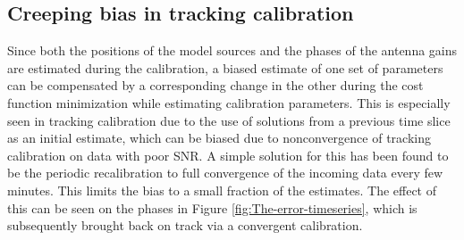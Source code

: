 \documentclass[referee]{aa}
\begin{document}
\subsection{Creeping bias in tracking calibration}

Since both  the positions  of the  model sources and the phases  of the
antenna gains are estimated during the calibration, a biased estimate of one set
of parameters can  be compensated by a corresponding change  in the other during
the cost function minimization  while estimating calibration parameters. This is
especially  seen in  tracking calibration  due to  the use  of solutions  from a
previous  time slice  as  an  initial  estimate,  which  can  be  biased  due  to
nonconvergence  of  tracking calibration  on  data  with  poor SNR.   A  simple
solution  for this  has been  found  to be  the periodic  recalibration to  full
convergence of  the incoming data every few  minutes. This limits the  bias to a
small fraction of the  estimates.  The effect of this can be  seen on the phases
in  Figure \ref{fig:The-error-timeseries}, which is subsequently  brought  back on
track via a convergent calibration.




\end{document}
